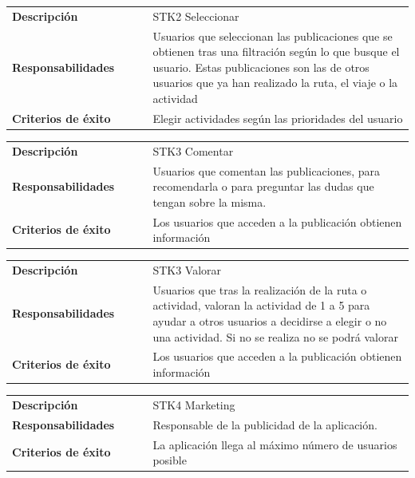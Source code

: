 \documentclass[11pt]{article}
\begin{document}
\begin{table}[H]
  \centering
  \begin{tabular}{p{0.35\linewidth}|p{0.65\linewidth}}
    \toprule
    \textbf{Descripción} & STK2 Seleccionar\\
    \textbf{Responsabilidades} & Usuarios que seleccionan las publicaciones que se obtienen tras una filtración según lo que busque el usuario. Estas publicaciones son las de otros usuarios que ya han realizado la ruta, el viaje o la actividad\\
    \textbf{Criterios de éxito} &  Elegir actividades según las prioridades del usuario\\
    \bottomrule
  \end{tabular}
\end{table}

\begin{table}[H]
  \centering
  \begin{tabular}{p{0.35\linewidth}|p{0.65\linewidth}}
    \toprule
    \textbf{Descripción} & STK3 Comentar\\
    \textbf{Responsabilidades} & Usuarios que comentan las publicaciones, para recomendarla o para preguntar las dudas que tengan sobre la misma.\\
    \textbf{Criterios de éxito} &  Los usuarios que acceden a la publicación obtienen información\\
    \bottomrule
  \end{tabular}
\end{table}

\begin{table}[H]
  \centering
  \begin{tabular}{p{0.35\linewidth}|p{0.65\linewidth}}
    \toprule
    \textbf{Descripción} & STK3 Valorar\\
    \textbf{Responsabilidades} & Usuarios que tras la realización de la ruta o actividad, valoran la actividad de 1 a 5 para ayudar a otros usuarios a decidirse a elegir o no una actividad. Si no se realiza no se podrá valorar\\
    \textbf{Criterios de éxito} & Los usuarios que acceden a la publicación obtienen información \\
    \bottomrule
  \end{tabular}
\end{table}

\begin{table}[H]
  \centering
  \begin{tabular}{p{0.35\linewidth}|p{0.65\linewidth}}
    \toprule
    \textbf{Descripción} & STK4 Marketing\\
    \textbf{Responsabilidades} & Responsable de la publicidad de la aplicación.\\
    \textbf{Criterios de éxito} &  La aplicación llega al máximo número de usuarios posible\\
    \bottomrule
  \end{tabular}
\end{table}
\end{document}
